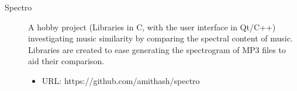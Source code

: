 \begin{description}

\item[Spectro]
A hobby project (Libraries in C, with the user interface in Qt/C++) investigating music similarity by comparing the spectral content of music. Libraries are created to ease generating the spectrogram of MP3 files to aid their comparison.
\begin{itemize}
\item URL: https://github.com/amithash/spectro
\end{itemize}

\end{description}

